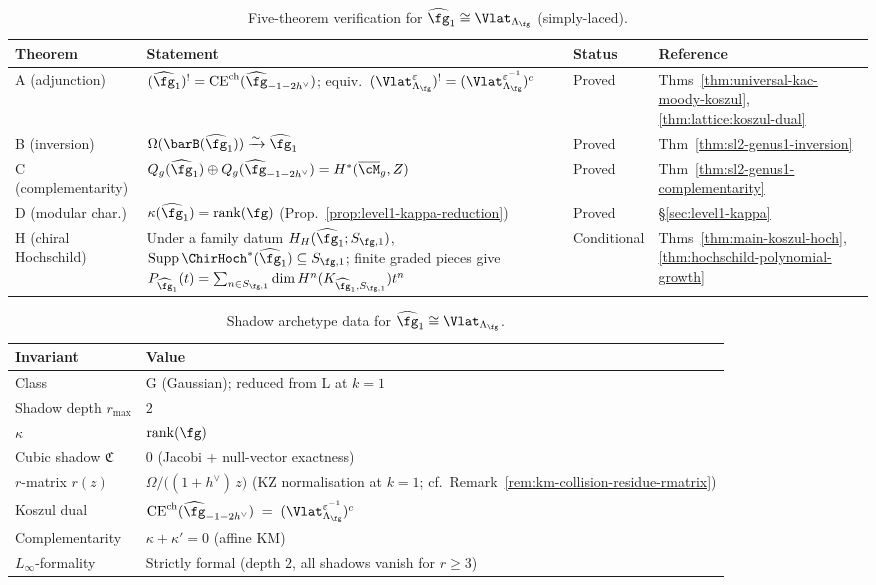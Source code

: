 \begin{table}[ht]
\centering
\small
\caption{Five-theorem verification for $\widehat{\fg}_1
\cong \Vlat_{\Lambda_\fg}$ (simply-laced).}%
\label{tab:level1-five-theorems}
\begin{tabular}{lp{5.8cm}ll}
\toprule
\textbf{Theorem} & \textbf{Statement}
 & \textbf{Status} & \textbf{Reference} \\
\midrule
A (adjunction) &
 $(\widehat{\fg}_1)^!
 = \mathrm{CE}^{\mathrm{ch}}(\widehat{\fg}_{-1-2h^\vee})$;
 equiv.\ $(\Vlat_{\Lambda_\fg}^{\varepsilon})^!
 = (\Vlat_{\Lambda_\fg}^{\varepsilon^{-1}})^c$
 & Proved
 & Thms~\ref{thm:universal-kac-moody-koszul},
 \ref{thm:lattice:koszul-dual} \\
B (inversion) &
 $\Omega(\barB(\widehat{\fg}_1))
 \xrightarrow{\sim} \widehat{\fg}_1$
 & Proved
 & Thm~\ref{thm:sl2-genus1-inversion} \\
C (complementarity) &
 $Q_g(\widehat{\fg}_1) \oplus
 Q_g(\widehat{\fg}_{-1-2h^\vee}) = H^*(\overline{\cM}_g, Z)$
 & Proved
 & Thm~\ref{thm:sl2-genus1-complementarity} \\
D (modular char.) &
 $\kappa(\widehat{\fg}_1) = \operatorname{rank}(\fg)$
 (Prop.~\ref{prop:level1-kappa-reduction})
 & Proved
 & \S\ref{sec:level1-kappa} \\
H (chiral Hochschild) &
 Under a family datum $H_H(\widehat{\fg}_1;S_{\fg,1})$,
 $\operatorname{Supp}\ChirHoch^*(\widehat{\fg}_1)
 \subseteq S_{\fg,1}$; finite graded pieces give
 $P_{\widehat{\fg}_1}(t)=
 \sum_{n\in S_{\fg,1}}\dim H^n(K_{\widehat{\fg}_1,S_{\fg,1}})t^n$
 & Conditional
 & Thms~\ref{thm:main-koszul-hoch},
 \ref{thm:hochschild-polynomial-growth} \\
\bottomrule
\end{tabular}
\end{table}

\begin{table}[ht]
\centering
\small
\caption{Shadow archetype data for $\widehat{\fg}_1
\cong \Vlat_{\Lambda_\fg}$.}%
\label{tab:level1-shadow-archetype}
\begin{tabular}{ll}
\toprule
\textbf{Invariant} & \textbf{Value} \\
\midrule
Class & G (Gaussian); reduced from L at $k = 1$ \\
Shadow depth $r_{\max}$ & $2$ \\
$\kappa$ & $\operatorname{rank}(\fg)$ \\
Cubic shadow $\mathfrak{C}$ & $0$ (Jacobi + null-vector exactness) \\
$r$-matrix $r(z)$ &
 $\Omega/\bigl((1{+}h^\vee)\,z\bigr)$ (KZ normalisation at $k = 1$; cf.\ Remark~\ref{rem:km-collision-residue-rmatrix}) \\
Koszul dual &
 $\mathrm{CE}^{\mathrm{ch}}(\widehat{\fg}_{-1-2h^\vee})
 \;=\; (\Vlat_{\Lambda_\fg}^{\varepsilon^{-1}})^c$ \\
Complementarity &
 $\kappa + \kappa' = 0$ (affine KM) \\
$L_\infty$-formality &
 Strictly formal (depth $2$, all shadows vanish for $r \geq 3$) \\
\bottomrule
\end{tabular}
\end{table}


